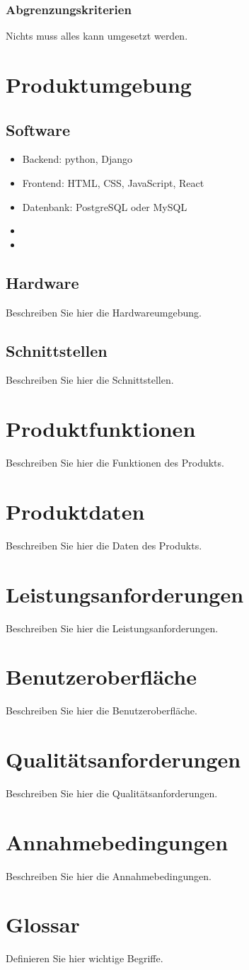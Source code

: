 \documentclass[a4paper,12pt]{article}
\begin{document}
\subsubsection{Abgrenzungskriterien}
Nichts muss alles kann umgesetzt werden.

\section{Produktumgebung}
\subsection{Software}
    \begin{itemize}
        \item Backend: python, Django 
        \item Frontend: HTML, CSS, JavaScript, React 
        \item Datenbank: PostgreSQL oder MySQL 
        \item 
        \item 
    \end{itemize}

\subsection{Hardware}
Beschreiben Sie hier die Hardwareumgebung.

\subsection{Schnittstellen}
Beschreiben Sie hier die Schnittstellen.

\section{Produktfunktionen}
Beschreiben Sie hier die Funktionen des Produkts.

\section{Produktdaten}
Beschreiben Sie hier die Daten des Produkts.

\section{Leistungsanforderungen}
Beschreiben Sie hier die Leistungsanforderungen.

\section{Benutzeroberfläche}
Beschreiben Sie hier die Benutzeroberfläche.

\section{Qualitätsanforderungen}
Beschreiben Sie hier die Qualitätsanforderungen.

\section{Annahmebedingungen}
Beschreiben Sie hier die Annahmebedingungen.

\section{Glossar}
Definieren Sie hier wichtige Begriffe.
\end{document}
